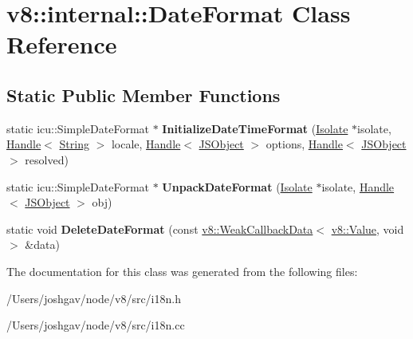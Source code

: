 \hypertarget{classv8_1_1internal_1_1_date_format}{}\section{v8\+:\+:internal\+:\+:Date\+Format Class Reference}
\label{classv8_1_1internal_1_1_date_format}
\subsection*{Static Public Member Functions}
\begin{DoxyCompactItemize}
\item 
static icu\+::\+Simple\+Date\+Format $\ast$ {\bfseries Initialize\+Date\+Time\+Format} (\hyperlink{classv8_1_1internal_1_1_isolate}{Isolate} $\ast$isolate, \hyperlink{classv8_1_1internal_1_1_handle}{Handle}$<$ \hyperlink{classv8_1_1internal_1_1_string}{String} $>$ locale, \hyperlink{classv8_1_1internal_1_1_handle}{Handle}$<$ \hyperlink{classv8_1_1internal_1_1_j_s_object}{J\+S\+Object} $>$ options, \hyperlink{classv8_1_1internal_1_1_handle}{Handle}$<$ \hyperlink{classv8_1_1internal_1_1_j_s_object}{J\+S\+Object} $>$ resolved)\hypertarget{classv8_1_1internal_1_1_date_format_ada7946193453b488f277068a8c72f699}{}\label{classv8_1_1internal_1_1_date_format_ada7946193453b488f277068a8c72f699}

\item 
static icu\+::\+Simple\+Date\+Format $\ast$ {\bfseries Unpack\+Date\+Format} (\hyperlink{classv8_1_1internal_1_1_isolate}{Isolate} $\ast$isolate, \hyperlink{classv8_1_1internal_1_1_handle}{Handle}$<$ \hyperlink{classv8_1_1internal_1_1_j_s_object}{J\+S\+Object} $>$ obj)\hypertarget{classv8_1_1internal_1_1_date_format_a0741eb0ed1e156d88d02a24a7133c4f2}{}\label{classv8_1_1internal_1_1_date_format_a0741eb0ed1e156d88d02a24a7133c4f2}

\item 
static void {\bfseries Delete\+Date\+Format} (const \hyperlink{classv8_1_1_weak_callback_data}{v8\+::\+Weak\+Callback\+Data}$<$ \hyperlink{classv8_1_1_value}{v8\+::\+Value}, void $>$ \&data)\hypertarget{classv8_1_1internal_1_1_date_format_a79757a0f61188eec67f7586cdd44aff1}{}\label{classv8_1_1internal_1_1_date_format_a79757a0f61188eec67f7586cdd44aff1}

\end{DoxyCompactItemize}


The documentation for this class was generated from the following files\+:\begin{DoxyCompactItemize}
\item 
/\+Users/joshgav/node/v8/src/i18n.\+h\item 
/\+Users/joshgav/node/v8/src/i18n.\+cc\end{DoxyCompactItemize}
